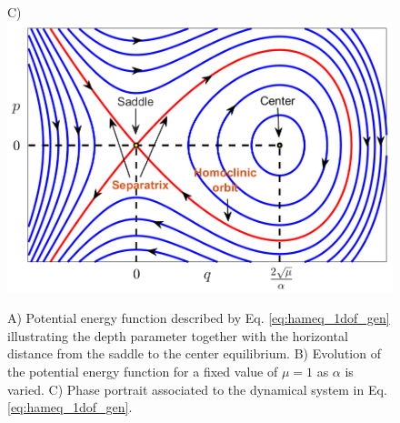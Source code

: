 \documentclass[8pt]{article}
\begin{document}
\begin{figure}[htbp]
\begin{center}
		C)\includegraphics[scale=0.28]{fig4c}
	\end{center}
	\caption{A) Potential energy function described by Eq. \eqref{eq:hameq_1dof_gen} illustrating the depth parameter together with the horizontal distance from the saddle to the center equilibrium. B) Evolution of the potential energy function for a fixed value of $\mu = 1$ as $\alpha$ is varied. C) Phase portrait associated to the dynamical system in Eq. \eqref{eq:hameq_1dof_gen}.}
	\label{fig:pes_1dof_alpha}
\end{figure} 
\end{document}

